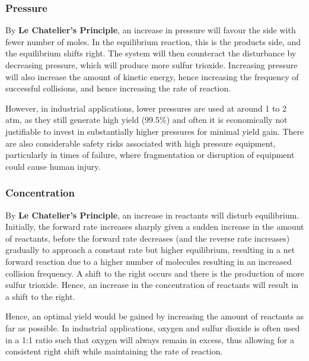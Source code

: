 \documentclass[12pt, a4paper]{article}
\begin{document}
\subsubsection{Pressure}

By \textbf{Le Chatelier's Principle}, an increase in pressure will favour the side with fewer number of moles. In the equilibrium reaction, this is the products side, and the equilibrium shifts right. The system will then counteract the disturbance by decreasing pressure, which will produce more sulfur trioxide. Increasing pressure will also increase the amount of kinetic energy, hence increasing the frequency of successful collisions, and hence increasing the rate of reaction.

However, in industrial applications, lower pressures are used at around 1 to 2 atm, as they still generate high yield (99.5\%) and often it is economically not justifiable to invest in substantially higher pressures for minimal yield gain. There are also considerable safety risks associated with high pressure equipment, particularly in times of failure, where fragmentation or disruption of equipment could cause human injury.






\subsubsection{Concentration}

By \textbf{Le Chatelier's Principle}, an increase in reactants will disturb equilibrium. Initially, the forward rate increases sharply given a sudden increase in the amount of reactants, before the forward rate decreases (and the reverse rate increases) gradually to approach a constant rate but higher equilibrium, resulting in a net forward reaction due to a higher number of molecules resulting in an increased collision frequency. A shift to the right occurs and there is the production of more sulfur trioxide. Hence, an increase in the concentration of reactants will result in a shift to the right. 

Hence, an optimal yield would be gained by increasing the amount of reactants as far as possible. In industrial applications, oxygen and sulfur dioxide is often used in a 1:1 ratio such that oxygen will always remain in excess, thus allowing for a consistent right shift while maintaining the rate of reaction.
\end{document}
